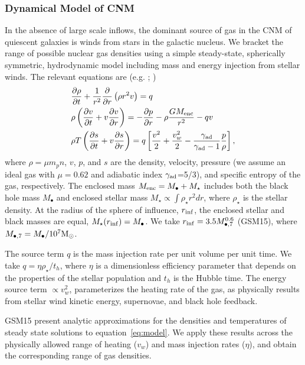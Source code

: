 \documentclass[usenatbib,fleqn]{mnras}
\newcommand{\Mbh}[1][]{M_{\bullet#1}}
\newcommand{\Menc}{M_{\rm enc}}
\newcommand{\Msun}{{\rm M_\odot}}
\begin{document}
\subsubsection{Dynamical Model of CNM}
\label{sec:model}

In the absence of large scale inflows, the dominant source of gas in
the CNM of quiescent galaxies is winds from stars in the galactic
nucleus. We bracket the range of possible nuclear gas densities using
a simple steady-state, spherically symmetric, hydrodynamic model
including mass and energy injection from stellar winds. The relevant
equations are (e.g. \citealt{Holzer+1970}; \citealt{Quataert2004})
\begin{align}
  &\frac{\partial \rho}{\partial t}+\frac{1}{r^2}\frac{\partial}{\partial r}\left(\rho r^2 v\right)=q \label{eq:drhodt}\\
  &\rho \left(\frac{\partial v}{\partial t} + v\frac{\partial
      v}{\partial r}\right) =-\frac{\partial p}{\partial r}- \rho\frac{GM_{\rm enc}}{r^{2}} -q v \label{eq:dvdt}\\
  &\rho T\left(\frac{\partial s}{\partial t} + v\frac{\partial
      s}{\partial
      r}\right)=q\left[\frac{v^2}{2}+\frac{v_w^2}{2}-\frac{\gamma_{\rm
      ad}}{\gamma_{\rm ad}-1}
    \frac{p}{\rho} \right] ,
\label{eq:model}
\end{align}
where $\rho = \mu m_p n$, $v$, $p$, and $s$ are the density, velocity,
pressure (we assume an ideal gas with $\mu = 0.62$ and adiabatic index
$\gamma_{\rm ad}$=5/3), and specific entropy of the gas,
respectively. The enclosed mass $\Menc = M_{\bullet} + M_{\star}$
includes both the black hole mass $M_{\bullet}$ and enclosed stellar
mass $M_{\star} \propto \int \rho_{\star}r^{2}dr$, where
$\rho_{\star}$ is the stellar density.  At the radius of the sphere of
influence, $r_{\rm inf}$, the enclosed stellar and black masses are
equal, $M_{\star}(r_{\rm inf})=\Mbh$.  We take $r_{\rm inf}=3.5
\Mbh[,7]^{0.6}$ (GSM15), where $\Mbh[,7]=\Mbh/10^7 \Msun$.

The source term $q$ is the mass injection rate per unit volume per
unit time. We take $q=\eta \rho_{\star}/t_h$, where $\eta$ is a
dimensionless efficiency parameter that depends on the properties of
the stellar population and $t_h$ is the Hubble time. The energy source
term $\propto v_w^{2}$, parameterizes the heating rate of the gas, as
physically results from stellar wind kinetic energy, supernovae, and
black hole feedback.

GSM15 present analytic approximations for the
densities and temperatures of steady state solutions to
equation~\eqref{eq:model}. We apply these results across the
physically allowed range of heating ($v_w$) and mass injection
rates ($\eta$), and obtain the corresponding range of gas densities.
\end{document}
